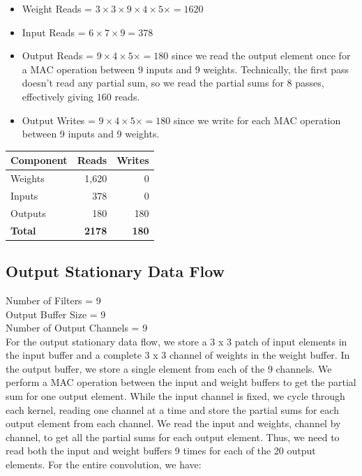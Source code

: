 \documentclass{article}
\begin{document}
\begin{itemize}
    \item Weight Reads = $3 \times 3 \times 9 \times 4 \times 5 \times = 1620$
    \item Input Reads = $6 \times 7 \times 9 = 378$
    \item Output Reads = $9 \times 4 \times 5 \times = 180$ since we read the output element once for a MAC operation between 9 inputs and 9 weights.
    Technically, the first pass doesn't read any partial sum, so we read the partial sums for 8 passes, effectively giving $160$ reads.
    \item Output Writes = $9 \times 4 \times 5 \times = 180$ since we write for each MAC operation between 9 inputs and 9 weights.
\end{itemize}

\begin{table}[h]
\centering
    \begin{tabular}{|l|r|r|}
    \hline
    \textbf{Component} & \textbf{Reads} & \textbf{Writes} \\ \hline
    Weights            & 1,620          & 0               \\ \hline
    Inputs             & 378          & 0               \\ \hline
    Outputs            & 180            & 180              \\ \hline
    \textbf{Total}     & \textbf{2178} & \textbf{180}     \\ \hline
    \end{tabular}
\end{table}

\subsection{Output Stationary Data Flow}

Number of Filters = 9 \\
Output Buffer Size = 9 \\
Number of Output Channels = 9 \\

For the output stationary data flow, we store a 3 x 3 patch of input elements in the input buffer and a complete 3 x 3 channel of weights in the weight buffer. 
In the output buffer, we store a single element from each of the 9 channels. We perform a MAC operation between the input and weight buffers to get the partial sum for one output element.
While the input channel is fixed, we cycle through each kernel, reading one channel at a time and store the partial sums for each output element from each channel.
We read the input and weights, channel by channel, to get all the partial sums for each output element.
Thus, we need to read both the input and weight buffers 9 times for each of the 20 output elements.
For the entire convolution, we have:
\end{document}
